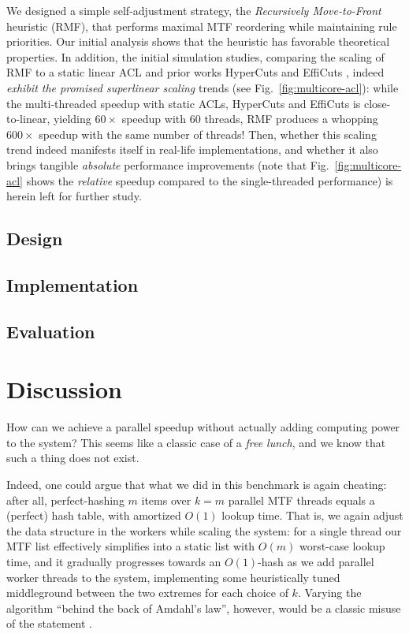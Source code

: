 \documentclass[letterpaper,twocolumn,10pt]{article}
\begin{document}
We designed a simple self-adjustment strategy, the \emph{Recursively Move-to-Front} heuristic (RMF), that performs maximal MTF reordering while maintaining rule priorities. Our initial analysis shows that the heuristic has favorable theoretical properties. In addition, the initial simulation studies, comparing the scaling of RMF to a static linear ACL and prior works HyperCuts \cite{10.1145/863955.863980} and EffiCuts \cite{10.1145/1851182.1851208}, indeed \emph{exhibit the promised superlinear scaling} trends (see Fig.~\ref{fig:multicore-acl}): while the multi-threaded speedup with static ACLs, HyperCuts and EffiCuts is close-to-linear, yielding $60\times$ speedup with $60$ threads, RMF produces a whopping $600\times$ speedup with the same number of threads! Then, whether this scaling trend indeed manifests itself in real-life implementations, and whether it also brings tangible \emph{absolute} performance improvements (note that Fig.~\ref{fig:multicore-acl} shows the \emph{relative} speedup compared to the single-threaded performance) is herein left for further study.

\subsection{Design}
\label{sec:design}

\subsection{Implementation}
\label{sec:implementation}

\subsection{Evaluation}
\label{sec:eval}

\section{Discussion}
\label{sec:discussion}

How can we achieve a parallel speedup without actually adding computing power to the system? This seems like a classic case of a \emph{free lunch}, and we know that such a thing does not exist.

Indeed, one could argue that what we did in this benchmark is again cheating: after all, perfect-hashing $m$ items over $k=m$ parallel MTF threads equals a (perfect) hash table, with amortized $O(1)$ lookup time. That is, we again adjust the data structure in the workers while scaling the system: for a single thread our MTF list effectively simplifies into a static list with $O(m)$  worst-case lookup time, and it gradually progresses towards an $O(1)$-hash as we add parallel worker threads to the system, implementing some heuristically tuned middleground between the two extremes for each choice of $k$. Varying the algorithm ``behind the back of Amdahl's law'', however, would be a classic misuse of the statement \cite{10.5555/775339.775386}.
\end{document}
